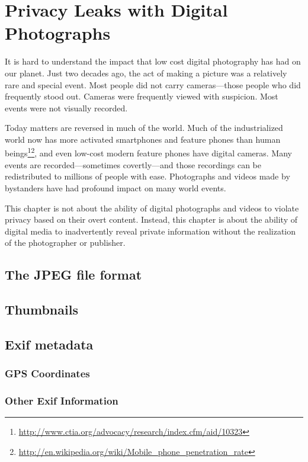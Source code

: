 \chapter{Privacy Leaks with Digital Photographs}

It is hard to understand the impact that low cost digital photography has had on our
planet. Just two decades ago, the act of making a picture was a
relatively rare and special event. Most people did not carry
cameras---those people who did frequently stood out. Cameras were
frequently viewed with suspicion. Most events were not visually
recorded. 

Today matters are reversed in much of the world. Much of the
industrialized world now has more activated smartphones and feature
phones than human
beings\footnote{\url{http://www.ctia.org/advocacy/research/index.cfm/aid/10323}}\footnote{\url{http://en.wikipedia.org/wiki/Mobile_phone_penetration_rate}},
and even low-cost modern feature phones have digital cameras. Many
events are recorded---sometimes covertly---and those recordings can be
redistributed to millions of people with ease. Photographs and videos
made by bystanders have had profound impact on many world events.

This chapter is not about the ability of digital photographs and
videos to violate privacy based on their overt content. Instead, this chapter
is about the ability of digital media to inadvertently reveal
private information without the realization of the photographer or
publisher.


\section{The JPEG file format}

\section{Thumbnails}

\section{Exif metadata}
\subsection{GPS Coordinates}
\subsection{Other Exif Information}

